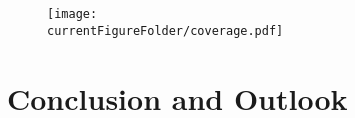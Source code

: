 \begin{figure}[th]
	\centering
	\texttt{[image: \\currentFigureFolder/coverage.pdf]}
	\label{fig:katrinElossResultsCoverage}
\end{figure}


\section{Conclusion and Outlook}
\label{sec:katrinElossModelConclusion}